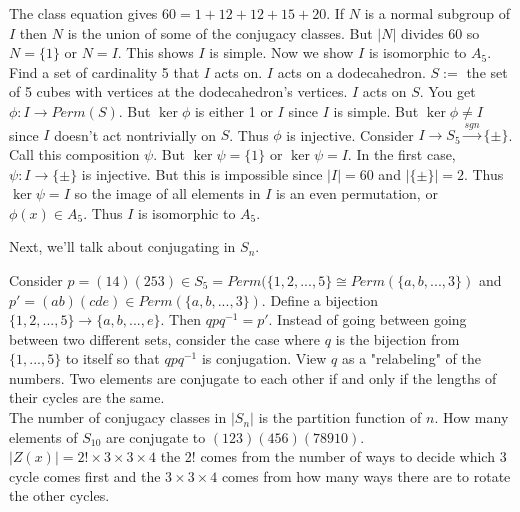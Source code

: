 \documentclass{article}
\newcommand{\ra}[1][]{\xrightarrow{#1}}
\begin{document}
The class equation gives $60=1+12+12+15+20$. If $N$ is a normal subgroup of $I$ then $N$ is the union of some of the conjugacy classes. But $|N|$ divides 60 so $N=\{1\}$ or $N=I$. This shows $I$ is simple. Now we show $I$ is isomorphic to $A_5$. Find a set of cardinality 5 that $I$ acts on. $I$ acts on a dodecahedron. $S:=$ the set of 5 cubes with vertices at the dodecahedron's vertices. $I$ acts on $S$. You get $\phi:I\ra Perm(S)$. But $\ker\phi$ is either 1 or $I$ since $I$ is simple. But $\ker\phi\neq I$ since $I$ doesn't act nontrivially on $S$. Thus $\phi$ is injective. Consider $I\ra S_5\ra[sgn]\{\pm\}$. Call this composition $\psi$. But $\ker\psi=\{1\}$ or $\ker\psi=I$. In the first case, $\psi:I\ra\{\pm\}$ is injective. But this is impossible since $|I|=60$ and $|\{\pm\}|=2$. Thus $\ker\psi=I$ so the image of all elements in $I$ is an even permutation, or $\phi(x)\in A_5$. Thus $I$ is isomorphic to $A_5$.

Next, we'll talk about conjugating in $S_n$.

Consider $p=(14)(253)\in S_5=Perm(\{1,2,...,5\}\cong Perm(\{a,b,...,3\})$ and $p'=(ab)(cde)\in Perm(\{a,b,...,3\})$. Define a bijection $\{1,2,...,5\}\ra\{a,b,...,e\}$. Then $qpq^{-1}=p'$. Instead of going between going between two different sets, consider the case where $q$ is the bijection from $\{1,...,5\}$ to itself so that $qpq^{-1}$ is conjugation. View $q$ as a "relabeling" of the numbers. Two elements are conjugate to each other if and only if the lengths of their cycles are the same. \\
The number of conjugacy classes in $|S_n|$ is the partition function of $n$. How many elements of $S_10$ are conjugate to $(123)(456)(789 {10})$. $|Z(x)|=2!\times 3\times 3\times 4$ the 2! comes from the number of ways to decide which 3 cycle comes first and the $3\times 3\times 4$ comes from how many ways there are to rotate the other cycles.
\end{document}
